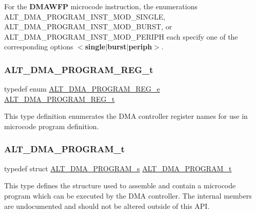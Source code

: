 For the {\bfseries{D\+M\+A\+W\+FP}} microcode instruction, the enumerations A\+L\+T\+\_\+\+D\+M\+A\+\_\+\+P\+R\+O\+G\+R\+A\+M\+\_\+\+I\+N\+S\+T\+\_\+\+M\+O\+D\+\_\+\+S\+I\+N\+G\+LE, A\+L\+T\+\_\+\+D\+M\+A\+\_\+\+P\+R\+O\+G\+R\+A\+M\+\_\+\+I\+N\+S\+T\+\_\+\+M\+O\+D\+\_\+\+B\+U\+R\+ST, or A\+L\+T\+\_\+\+D\+M\+A\+\_\+\+P\+R\+O\+G\+R\+A\+M\+\_\+\+I\+N\+S\+T\+\_\+\+M\+O\+D\+\_\+\+P\+E\+R\+I\+PH each specify one of the corresponding options {\bfseries{$<$single$\vert$burst$\vert$periph$>$}}. \mbox{\label{group__ALT__DMA__PRG_ga772371a3d6334e110911154cf94950e8}} 
\subsubsection{\texorpdfstring{ALT\_DMA\_PROGRAM\_REG\_t}{ALT\_DMA\_PROGRAM\_REG\_t}}
{\footnotesize\ttfamily typedef enum \mbox{\hyperlink{group__ALT__DMA__PRG_ga5976fbec36fb5886299550ec7d57ef01}{A\+L\+T\+\_\+\+D\+M\+A\+\_\+\+P\+R\+O\+G\+R\+A\+M\+\_\+\+R\+E\+G\+\_\+e}}
 \mbox{\hyperlink{group__ALT__DMA__PRG_ga772371a3d6334e110911154cf94950e8}{A\+L\+T\+\_\+\+D\+M\+A\+\_\+\+P\+R\+O\+G\+R\+A\+M\+\_\+\+R\+E\+G\+\_\+t}}}

This type definition enumerates the D\+MA controller register names for use in microcode program definition. \mbox{\label{group__ALT__DMA__PRG_gadb7028531574894854db4db6d797de97}} 
\subsubsection{\texorpdfstring{ALT\_DMA\_PROGRAM\_t}{ALT\_DMA\_PROGRAM\_t}}
{\footnotesize\ttfamily typedef struct \mbox{\hyperlink{structALT__DMA__PROGRAM__s}{A\+L\+T\+\_\+\+D\+M\+A\+\_\+\+P\+R\+O\+G\+R\+A\+M\+\_\+s}}
 \mbox{\hyperlink{group__ALT__DMA__PRG_gadb7028531574894854db4db6d797de97}{A\+L\+T\+\_\+\+D\+M\+A\+\_\+\+P\+R\+O\+G\+R\+A\+M\+\_\+t}}}

This type defines the structure used to assemble and contain a microcode program which can be executed by the D\+MA controller. The internal members are undocumented and should not be altered outside of this A\+PI. 

